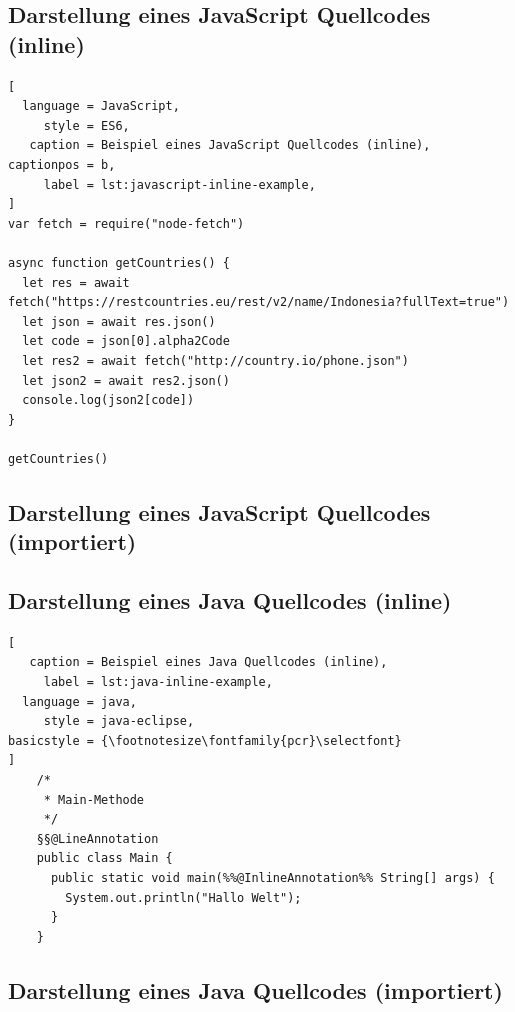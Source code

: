 \subsection{Darstellung eines JavaScript Quellcodes (inline)}

\begin{lstlisting}[
  language = JavaScript,
     style = ES6,
   caption = Beispiel eines JavaScript Quellcodes (inline),
captionpos = b,
     label = lst:javascript-inline-example,
]
var fetch = require("node-fetch")

async function getCountries() {
  let res = await fetch("https://restcountries.eu/rest/v2/name/Indonesia?fullText=true")
  let json = await res.json()
  let code = json[0].alpha2Code
  let res2 = await fetch("http://country.io/phone.json")
  let json2 = await res2.json()
  console.log(json2[code])
}

getCountries()
\end{lstlisting}

\subsection{Darstellung eines JavaScript Quellcodes (importiert)}



\subsection{Darstellung eines Java Quellcodes (inline)}

\begin{lstlisting}[
   caption = Beispiel eines Java Quellcodes (inline),
     label = lst:java-inline-example,
  language = java, 
     style = java-eclipse,
basicstyle = {\footnotesize\fontfamily{pcr}\selectfont}
]
	/*
	 * Main-Methode
	 */
	§§@LineAnnotation
	public class Main {
	  public static void main(%%@InlineAnnotation%% String[] args) {
	    System.out.println("Hallo Welt");
	  }
	}
\end{lstlisting}

\subsection{Darstellung eines Java Quellcodes (importiert)}

